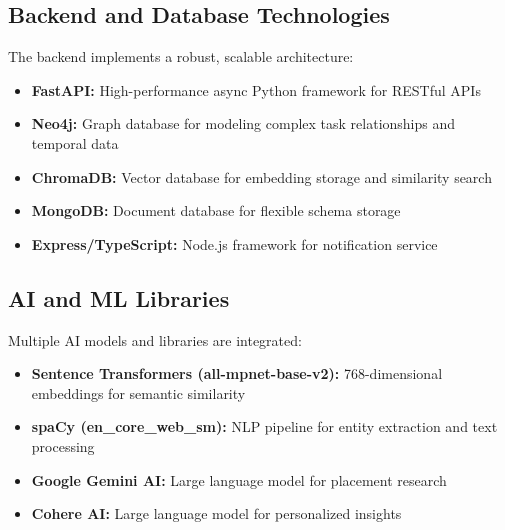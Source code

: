\documentclass[conference]{IEEEtran}
\begin{document}
\subsection{Backend and Database Technologies}
The backend implements a robust, scalable architecture:
\begin{itemize}
    \item \textbf{FastAPI:} High-performance async Python framework for RESTful APIs
    \item \textbf{Neo4j:} Graph database for modeling complex task relationships and temporal data
    \item \textbf{ChromaDB:} Vector database for embedding storage and similarity search
    \item \textbf{MongoDB:} Document database for flexible schema storage
    \item \textbf{Express/TypeScript:} Node.js framework for notification service
\end{itemize}

\subsection{AI and ML Libraries}
Multiple AI models and libraries are integrated:
\begin{itemize}
    \item \textbf{Sentence Transformers (all-mpnet-base-v2):} 768-dimensional embeddings for semantic similarity
    \item \textbf{spaCy (en\_core\_web\_sm):} NLP pipeline for entity extraction and text processing
    \item \textbf{Google Gemini AI:} Large language model for placement research
    \item \textbf{Cohere AI:} Large language model for personalized insights
\end{itemize}
\end{document}
